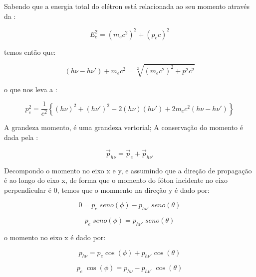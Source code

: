 \documentclass[11pt,a4paper]{article}
\begin{document}
            
            \noindent Sabendo que a energia total do elétron está relacionada ao seu momento através da :

                \begin{equation}
                    E_e^2 = (m_ec^2)^2 + (p_ec)^2
                \end{equation}

            \noindent temos então que:

                \begin{equation}
                    (h\nu - h\nu') + m_ec^2 = \sqrt[2]{(m_ec^2)^2 + p^2 c^2}
                \end{equation}

            \noindent o que nos leva a :

                \begin{equation}
                    p_e^2 = \frac{1}{c^2} \left\{ (h\nu)^2 + (h\nu')^2 - 2 (h\nu)(h\nu') + 2m_ec^2(h\nu - h\nu')\right\}
                    \label{eq:momentoConserEner}
                \end{equation}

            \noindent A grandeza momento, é uma grandeza vertorial; A conservação do momento é dada pela :

                \begin{equation}
                    \vec{p}_{h\nu} = \vec{p}_e + \vec{p}_{h\nu'}
                 \end{equation}

            \noindent Decompondo o momento no eixo x e y, e assumindo que a direção de propagação é ao longo do eixo x, de forma que o momento do fóton incidente no eixo perpendicular é 0, temos que o momnento na direção y é dado por:

                 $$0 = p_e \; seno(\phi) - p_{h\nu'} \; seno(\theta)$$

                 \begin{equation}
                    p_e \; seno(\phi) = p_{h\nu'} \; seno(\theta)
                 \end{equation}

            \noindent o momento no eixo x é dado por:

                 $$p_{h\nu} = p_e \cos(\phi) + p_{h\nu'} \cos(\theta)$$

                 \begin{equation}
                    p_e \; \cos(\phi) = p_{h\nu} - p_{h\nu'} \; \cos(\theta)
                 \end{equation}
\end{document}
